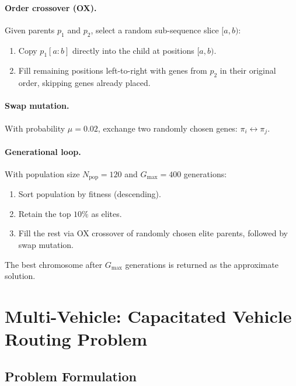 \documentclass[12pt, a4paper]{article}
\theoremstyle{definition}
\begin{document}
\paragraph{Order crossover (OX).}
Given parents $p_1$ and $p_2$, select a random sub-sequence slice $[a, b)$:

\begin{enumerate}[noitemsep]
  \item Copy $p_1[a:b]$ directly into the child at positions $[a, b)$.
  \item Fill remaining positions left-to-right with genes from $p_2$ in their
        original order, skipping genes already placed.
\end{enumerate}

\paragraph{Swap mutation.}
With probability $\mu = 0.02$, exchange two randomly chosen genes:
$\pi_i \leftrightarrow \pi_j$.

\paragraph{Generational loop.}
With population size $N_{\text{pop}} = 120$ and $G_{\text{max}} = 400$
generations:
\begin{enumerate}[noitemsep]
  \item Sort population by fitness (descending).
  \item Retain the top $10\%$ as elites.
  \item Fill the rest via OX crossover of randomly chosen elite parents,
        followed by swap mutation.
\end{enumerate}

The best chromosome after $G_{\text{max}}$ generations is returned as the
approximate solution.

\section{Multi-Vehicle: Capacitated Vehicle Routing Problem}

\subsection{Problem Formulation}
\end{document}
